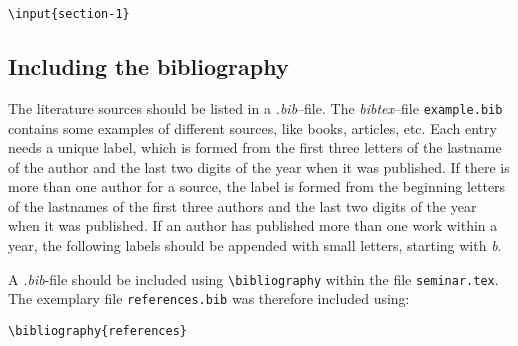\texttt{\textbackslash input\{section-1\}}

%
\subsection{Including the bibliography}
%
The literature sources should be listed in a \textit{.bib}--file.
The \textit{bibtex}--file \texttt{example.bib} contains some examples of different sources, like books, articles, etc.
Each entry needs a unique label, which is formed from the first three letters of the lastname of the author and the last two digits of the year when it was published.
If there is more than one author for a source, the label is formed from the beginning letters of the lastnames of the first three authors and the last two digits of the year when it was published.
If an author has published more than one work within a year, the following labels should be appended with small letters, starting with \textit{b}.

A \textit{.bib}-file should be included using \texttt{\textbackslash bibliography} within the file \texttt{seminar.tex}.
The exemplary file \texttt{references.bib} was therefore included using:

\texttt{\textbackslash bibliography\{references\}}